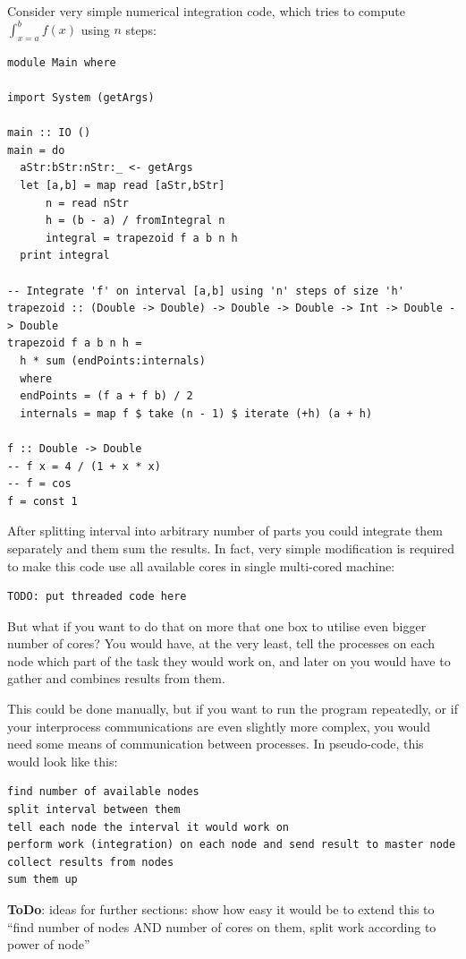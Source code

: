\documentclass{tmr}
\newcommand{\ToDo}[1]{\textbf{ToDo}{#1}}
\begin{document}
Consider very simple numerical integration code, which tries to
compute $\int_{x=a}^{b} f(x)$ using $n$ steps:
\begin{listing}
\begin{Verbatim}
module Main where

import System (getArgs)

main :: IO ()
main = do
  aStr:bStr:nStr:_ <- getArgs
  let [a,b] = map read [aStr,bStr]
      n = read nStr
      h = (b - a) / fromIntegral n
      integral = trapezoid f a b n h
  print integral 

-- Integrate 'f' on interval [a,b] using 'n' steps of size 'h'
trapezoid :: (Double -> Double) -> Double -> Double -> Int -> Double -> Double
trapezoid f a b n h =
  h * sum (endPoints:internals)
  where
  endPoints = (f a + f b) / 2
  internals = map f $ take (n - 1) $ iterate (+h) (a + h)

f :: Double -> Double
-- f x = 4 / (1 + x * x)
-- f = cos
f = const 1
\end{Verbatim}
\end{listing}

After splitting interval into arbitrary number of parts you could
integrate them separately and them sum the results. In fact, very
simple modification is required to make this code use all available
cores in single multi-cored machine:
\begin{Verbatim}
TODO: put threaded code here
\end{Verbatim}

But what if you want to do that on more that one box to utilise even
bigger number of cores? You would have, at the very least, tell the
processes on each node which part of the task they would work on, and
later on you would have to gather and combines results from them.

This could be done manually, but if you want to run the program
repeatedly, or if your interprocess communications are even slightly
more complex, you would need some means of communication between
processes. In pseudo-code, this would look like this:

\begin{Verbatim}
find number of available nodes
split interval between them
tell each node the interval it would work on
perform work (integration) on each node and send result to master node
collect results from nodes
sum them up
\end{Verbatim}

\ToDo: ideas for further sections: show how easy it would be to extend this to ``find number of nodes AND number of cores on them, split work according to power of node''
\end{document}
